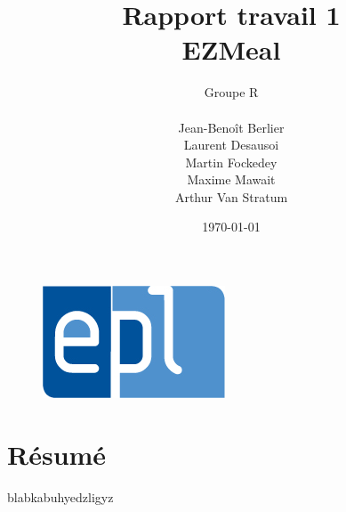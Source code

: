 \documentclass[a4paper,10pt]{report}
\title{Rapport travail 1 \\EZMeal}
\author{Groupe R\\ \\Jean-Benoît Berlier\\Laurent Desausoi \\ Martin Fockedey \\Maxime Mawait \\Arthur Van Stratum 
}
\date{\today}
\begin{document}
\begin{titlepage}
\begin{figure}[t]
\includegraphics[scale=0.3]{epl-logo.jpg}
\end{figure}

\maketitle 
\end{titlepage}
\section*{Résumé}
blabkabuhyedzligyz
\end{document}
